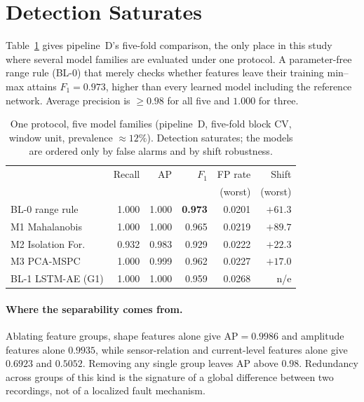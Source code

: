 \documentclass{article}
\begin{document}
\section{Detection Saturates}
\label{sec:saturation}

Table~\ref{tab:saturation} gives pipeline~D's five-fold comparison, the only
place in this study where several model families are evaluated under one
protocol. A parameter-free range rule (BL-0) that merely checks whether
features leave their training min--max attains $F_1 = 0.973$, higher than every
learned model including the reference network. Average precision is $\ge 0.98$
for all five and $1.000$ for three.

\begin{table}[t]
\caption{One protocol, five model families (pipeline~D, five-fold block CV,
window unit, prevalence $\approx 12\%$). Detection saturates; the models are
ordered only by false alarms and by shift robustness.}
\label{tab:saturation}
\vskip 0.08in
\centering
\small
\setlength{\tabcolsep}{3.5pt}
\begin{tabular}{lrrrrr}
\toprule
 & Recall & AP & $F_1$ & FP rate & Shift \\
 &  &  &  & (worst) & (worst) \\
\midrule
BL-0 range rule   & 1.000 & 1.000 & \textbf{0.973} & 0.0201 & $+61.3$ \\
M1 Mahalanobis    & 1.000 & 1.000 & 0.965 & 0.0219 & $+89.7$ \\
M2 Isolation For. & 0.932 & 0.983 & 0.929 & 0.0222 & $+22.3$ \\
M3 PCA-MSPC       & 1.000 & 0.999 & 0.962 & 0.0227 & $\mathbf{+17.0}$ \\
BL-1 LSTM-AE (G1) & 1.000 & 1.000 & 0.959 & 0.0268 & n/e \\
\bottomrule
\end{tabular}
\end{table}

\paragraph{Where the separability comes from.} Ablating feature groups, shape
features alone give $\mathrm{AP} = 0.9986$ and amplitude features alone
$0.9935$, while sensor-relation and current-level features alone give $0.6923$
and $0.5052$. Removing any single group leaves AP above $0.98$. Redundancy
across groups of this kind is the signature of a global difference between two
recordings, not of a localized fault mechanism.
\end{document}
